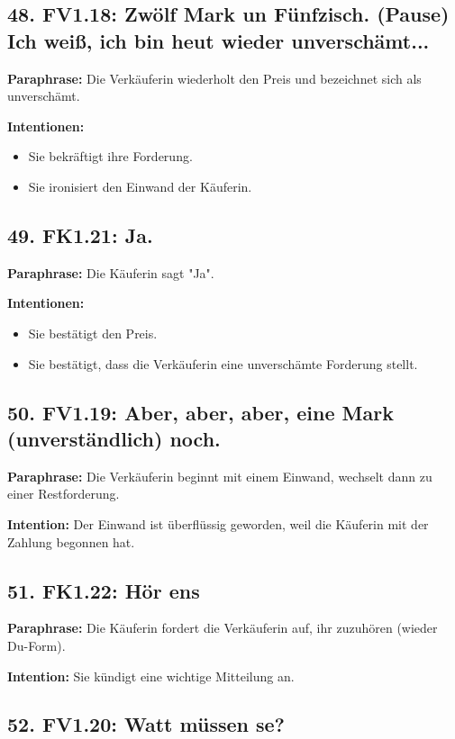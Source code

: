 \documentclass[11pt]{article}
\begin{document}
\subsection*{48. FV1.18: Zwölf Mark un Fünfzisch. (Pause) Ich weiß, ich bin heut wieder unverschämt...}

\textbf{Paraphrase:} Die Verkäuferin wiederholt den Preis und bezeichnet sich als unverschämt.

\textbf{Intentionen:}
\begin{itemize}
    \item Sie bekräftigt ihre Forderung.
    \item Sie ironisiert den Einwand der Käuferin.
\end{itemize}

\subsection*{49. FK1.21: Ja.}

\textbf{Paraphrase:} Die Käuferin sagt "Ja".

\textbf{Intentionen:}
\begin{itemize}
    \item Sie bestätigt den Preis.
    \item Sie bestätigt, dass die Verkäuferin eine unverschämte Forderung stellt.
\end{itemize}

\subsection*{50. FV1.19: Aber, aber, aber, eine Mark (unverständlich) noch.}

\textbf{Paraphrase:} Die Verkäuferin beginnt mit einem Einwand, wechselt dann zu einer Restforderung.

\textbf{Intention:} Der Einwand ist überflüssig geworden, weil die Käuferin mit der Zahlung begonnen hat.

\subsection*{51. FK1.22: Hör ens}

\textbf{Paraphrase:} Die Käuferin fordert die Verkäuferin auf, ihr zuzuhören (wieder Du-Form).

\textbf{Intention:} Sie kündigt eine wichtige Mitteilung an.

\subsection*{52. FV1.20: Watt müssen se?}
\end{document}
